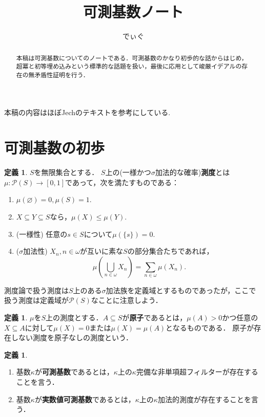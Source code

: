 \documentclass[uplatex]{jsarticle}
\title{可測基数ノート}
\author{でぃぐ}
\newcommand{\Pow}{\mathcal{P}}
\renewcommand\emptyset{\varnothing}
\renewcommand\subset{\subseteq}
\theoremstyle{definition}
\newtheorem{defi}[thm]{定義}
\begin{document}
	
	\maketitle
	
	\begin{abstract}
		本稿は可測基数についてのノートである．可測基数のかなり初歩的な話からはじめ，超冪と初等埋め込みという標準的な話題を扱い，最後に応用として峻厳イデアルの存在の無矛盾性証明を行う．
	\end{abstract}
	
	\tableofcontents
	
	\vspace{1cm}
	
	本稿の内容はほぼJechのテキスト\cite{jech2006set}を参考にしている.
	
	\section{可測基数の初歩}
	
	\begin{defi}
		$S$を無限集合とする． $S$上の(一様かつ$\sigma$加法的な確率)\textbf{測度}とは$\mu \colon \Pow(S) \to [0, 1]$であって，次を満たすものである：
		\begin{enumerate}
			\item $\mu(\emptyset) = 0, \mu(S) = 1$.
			\item $X \subset Y \subset S$なら，$\mu(X) \le \mu(Y)$.
			\item (一様性) 任意の$s \in S$について$\mu(\{s\}) = 0$.
			\item ($\sigma$加法性) $X_n, n \in \omega$が互いに素な$S$の部分集合たちであれば，
			\[
			\mu\left(\bigcup_{n \in \omega} X_n\right) = \sum_{n \in \omega} \mu(X_n). 
			\]
		\end{enumerate}
	\end{defi}
	
	測度論で扱う測度は$S$上のある$\sigma$加法族を定義域とするものであったが，ここで扱う測度は定義域が$\Pow(S)$なことに注意しよう．
	
	\begin{defi}
		$\mu$を$S$上の測度とする．$A \subset S$が\textbf{原子}であるとは，$\mu(A) > 0$かつ任意の$X \subset A$に対して$\mu(X) = 0$または$\mu(X) = \mu(A)$となるものである．
		原子が存在しない測度を原子なしの測度という．
	\end{defi}
	
	\begin{defi}
		\begin{enumerate}
			\item 基数$\kappa$が\textbf{可測基数}であるとは，$\kappa$上の$\kappa$完備な非単項超フィルターが存在することを言う．
			\item 基数$\kappa$が\textbf{実数値可測基数}であるとは，$\kappa$上の$\kappa$加法的測度が存在することを言う．
		\end{enumerate}
	\end{defi}
	
\end{document}

